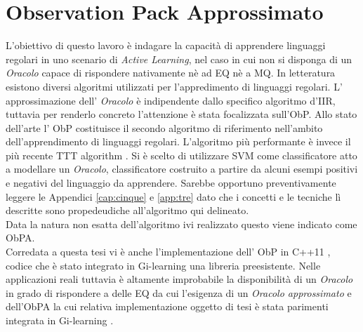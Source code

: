 
\chapter[OBP App.]{Observation Pack Approssimato} %
\label{cap:sei}
L'obiettivo di questo lavoro è indagare la capacità di apprendere linguaggi regolari in uno scenario di \textit{Active Learning}, nel caso in cui non si disponga di un \textit{Oracolo} capace di rispondere nativamente nè ad \ac{EQ} nè a \ac{MQ}.  
In letteratura esistono diversi algoritmi utilizzati per  l'appredimento di linguaggi regolari. 
L' approssimazione dell' \textit{Oracolo} è  indipendente dallo specifico algoritmo d'\ac{IIR}, tuttavia per renderlo concreto l'attenzione è stata focalizzata sull'\ac{ObP}.
Allo stato dell'arte l' \ac{ObP} costituisce il secondo algoritmo di riferimento nell'ambito dell'apprendimento di linguaggi regolari.  L'algoritmo più performante è invece il più recente TTT algorithm \cite{SteffenTTT14}. Si è scelto di utilizzare \ac{SVM} come classificatore atto a modellare un \textit{Oracolo}, classificatore costruito a partire da alcuni esempi positivi e negativi del linguaggio da apprendere. Sarebbe opportuno preventivamente leggere le Appendici \ref{cap:cinque}  e \ref{app:tre} dato che i concetti e le tecniche lì descritte sono propedeudiche all'algoritmo qui delineato.\\
 Data la natura non esatta dell'algoritmo ivi realizzato questo viene indicato come \ac{ObPA}.\\
  Corredata a questa tesi vi è anche l'implementazione dell' \ac{ObP} in C++11 , codice che è stato integrato in  Gi-learning \cite{Cot16} una libreria preesistente. Nelle applicazioni reali tuttavia è altamente improbabile la disponibilità di un \textit{Oracolo} in grado di rispondere a delle \ac{EQ} da cui l'esigenza di un \textit{Oracolo approssimato} e dell'\ac{ObPA} la cui relativa implementazione oggetto di tesi è stata parimenti integrata in  Gi-learning \cite{Cot16}.


